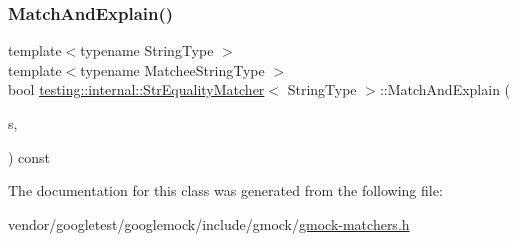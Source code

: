\mbox{\label{classtesting_1_1internal_1_1_str_equality_matcher_aedb1ac6fc8c15b318dfd8e99927aa2e1}} 
\subsubsection{\texorpdfstring{Match\+And\+Explain()}{MatchAndExplain()}\hspace{0.1cm}{\footnotesize\ttfamily [2/2]}}
{\footnotesize\ttfamily template$<$typename String\+Type $>$ \\
template$<$typename Matchee\+String\+Type $>$ \\
bool \hyperlink{classtesting_1_1internal_1_1_str_equality_matcher}{testing\+::internal\+::\+Str\+Equality\+Matcher}$<$ String\+Type $>$\+::Match\+And\+Explain (\begin{DoxyParamCaption}\item[{const Matchee\+String\+Type \&}]{s,  }\item[{\hyperlink{classtesting_1_1_match_result_listener}{Match\+Result\+Listener} $\ast$}]{ }\end{DoxyParamCaption}) const\hspace{0.3cm}{\ttfamily [inline]}}



The documentation for this class was generated from the following file\+:\begin{DoxyCompactItemize}
\item 
vendor/googletest/googlemock/include/gmock/\hyperlink{gmock-matchers_8h}{gmock-\/matchers.\+h}\end{DoxyCompactItemize}
